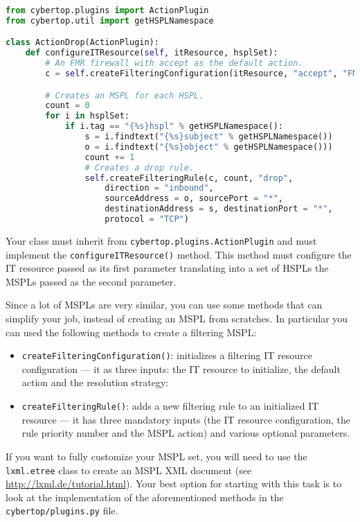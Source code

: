 \documentclass{scrartcl}
\begin{document}
\begin{lstlisting}[language = Python, caption = Example of an action plug-in., label = lis:actionFile]
from cybertop.plugins import ActionPlugin
from cybertop.util import getHSPLNamespace

class ActionDrop(ActionPlugin):
	def configureITResource(self, itResource, hsplSet):
		# An FMR firewall with accept as the default action.
		c = self.createFilteringConfiguration(itResource, "accept", "FMR")

		# Creates an MSPL for each HSPL.
		count = 0
		for i in hsplSet:
			if i.tag == "{%s}hspl" % getHSPLNamespace():
				s = i.findtext("{%s}subject" % getHSPLNamespace())
				o = i.findtext("{%s}object" % getHSPLNamespace()))
				count += 1
				# Creates a drop rule.
				self.createFilteringRule(c, count, "drop",
					direction = "inbound",
					sourceAddress = o, sourcePort = "*",
					destinationAddress = s, destinationPort = "*",
					protocol = "TCP")

\end{lstlisting}

Your class must inherit from \lstinline|cybertop.plugins.ActionPlugin| and must implement the \lstinline|configureITResource()| method. This method must configure the IT resource passed as its first parameter translating into a set of HSPLs the MSPLs passed as the second parameter.

Since a lot of MSPLs are very similar, you can use some methods that can simplify your job, instead of creating an MSPL from scratches. In particular you can used the following methods to create a filtering MSPL:

\begin{itemize}
	\item \lstinline|createFilteringConfiguration()|: initializes a filtering IT resource configuration --- it as three inputs: the IT resource to initialize, the default action and the resolution strategy:
	\item \lstinline|createFilteringRule()|: adds a new filtering rule to an initialized IT resource --- it has three mandatory inputs (the IT resource configuration, the rule priority number and the MSPL action) and various optional parameters.
\end{itemize}

If you want to fully customize your MSPL set, you will need to use the \lstinline|lxml.etree| class to create an MSPL XML document (see \url{http://lxml.de/tutorial.html}). Your best option for starting with this task is to look at the implementation of the aforementioned methods in the \lstinline|cybertop/plugins.py| file.
\end{document}
